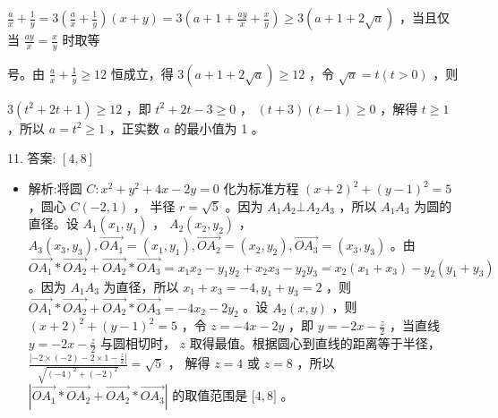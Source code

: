 \documentclass[10pt]{article}
\begin{document}
\(\frac{a}{x} + \frac{1}{y} = 3\left( {\frac{a}{x} + \frac{1}{y}}\right) \left( {x + y}\right)  = 3\left( {a + 1 + \frac{ay}{x} + \frac{x}{y}}\right)  \geq  3\left( {a + 1 + 2\sqrt{a}}\right)\) ，当且仅当 \(\frac{ay}{x} = \frac{x}{y}\) 时取等

号。由 \(\frac{a}{x} + \frac{1}{y} \geq  {12}\) 恒成立，得 \(3\left( {a + 1 + 2\sqrt{a}}\right)  \geq  {12}\) ，令 \(\sqrt{a} = t\left( {t > 0}\right)\) ，则

\(3\left( {{t}^{2} + {2t} + 1}\right)  \geq  {12}\) ，即 \({t}^{2} + {2t} - 3 \geq  0\) ， \(\left( {t + 3}\right) \left( {t - 1}\right)  \geq  0\) ，解得 \(t \geq  1\) ，所以 \(a = {t}^{2} \geq  1\) ，正实数 \(a\) 的最小值为 1 。

11. 答案: \(\left\lbrack  {4,8}\right\rbrack\)

\begin{itemize}\relax
\item\relax 解析:将圆 \(C : {x}^{2} + {y}^{2} + {4x} - {2y} = 0\) 化为标准方程 \({\left( x + 2\right) }^{2} + {\left( y - 1\right) }^{2} = 5\) ，圆心 \(C\left( {-2,1}\right)\) ， 半径 \(r = \sqrt{5}\) 。因为 \({A}_{1}{A}_{2} \bot  {A}_{2}{A}_{3}\) ，所以 \({A}_{1}{A}_{3}\) 为圆的直径。设 \({A}_{1}\left( {{x}_{1},{y}_{1}}\right)\) ， \({A}_{2}\left( {{x}_{2},{y}_{2}}\right)\) ， \({A}_{3}\left( {{x}_{3},{y}_{3}}\right) ,\overrightarrow{O{A}_{1}} = \left( {{x}_{1},{y}_{1}}\right) ,\overrightarrow{O{A}_{2}} = \left( {{x}_{2},{y}_{2}}\right) ,\overrightarrow{O{A}_{3}} = \left( {{x}_{3},{y}_{3}}\right)\) 。由 \(\overrightarrow{O{A}_{1}} * \overrightarrow{O{A}_{2}} + \overrightarrow{O{A}_{2}} * \overrightarrow{O{A}_{3}} = {x}_{1}{x}_{2} - {y}_{1}{y}_{2} + {x}_{2}{x}_{3} - {y}_{2}{y}_{3} = {x}_{2}\left( {{x}_{1} + {x}_{3}}\right)  - {y}_{2}\left( {{y}_{1} + {y}_{3}}\right)\) 。因为 \({A}_{1}{A}_{3}\) 为直径，所以 \({x}_{1} + {x}_{3} =  - 4,{y}_{1} + {y}_{3} = 2\) ，则 \(\overrightarrow{O{A}_{1}} * \overrightarrow{O{A}_{2}} + \overrightarrow{O{A}_{2}} * \overrightarrow{O{A}_{3}} =  - 4{x}_{2} - 2{y}_{2}\) 。设 \({A}_{2}\left( {x,y}\right)\) ，则 \({\left( x + 2\right) }^{2} + {\left( y - 1\right) }^{2} = 5\) ，令 \(z =  - {4x} - {2y}\) ，即 \(y =  - {2x} - \frac{z}{2}\) ，当直线 \(y =  - {2x} - \frac{z}{2}\) 与圆相切时， \(z\) 取得最值。根据圆心到直线的距离等于半径， \(\frac{\left| -2 \times  \left( -2\right)  - 2 \times  1 - \frac{z}{2}\right| }{\sqrt{{\left( -4\right) }^{2} + {\left( -2\right) }^{2}}} = \sqrt{5}\) ， 解得 \(z = 4\) 或 \(z = 8\) ，所以 \(\left| {\overrightarrow{O{A}_{1}} * \overrightarrow{O{A}_{2}} + \overrightarrow{O{A}_{2}} * \overrightarrow{O{A}_{3}}}\right|\) 的取值范围是 \(\lbrack 4,8\rbrack\) 。
\end{itemize}
\end{document}
